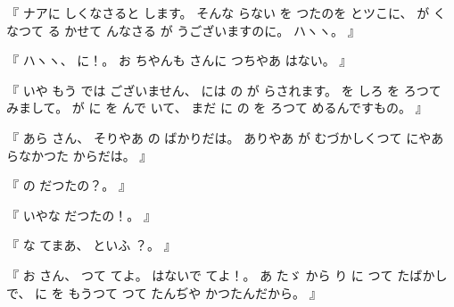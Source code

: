 %
『
ナアに
しくなさると
します。
%
そんな
らない
を
つたのを
とツこに、
%
が
くなつて
る
かせて
んなさる
が
うございますのに。
%
ハヽヽ。
』

%
『
ハヽヽ、
%
に！。%
%
お
ちやんも
さんに
つちやあ
はない。
』

%
『
いや
もう
では
ございません、
%
には
の
が
らされます。
%
を
しろ
を
ろつて
みまして。
%
が
に
を
んで
いて、
%
まだ
に
の
を
ろつて
めるんですもの。
』

%
『
あら
さん、
%
そりやあ
の
ばかりだは。
%
ありやあ
が
むづかしくつて
にやあ
らなかつた
からだは。
』

%
『
の
だつたの？。
』

%
『
いやな
だつたの！。
』

%
『
な
てまあ、
%
といふ
？。
』

%
『
お
さん、
%
つて
てよ。
%
はないで
てよ！。
あ
たゞ%
から
り
に
つて
たばかしで、
%
に
を
もうつて
つて
たんぢや
かつたんだから。
』

